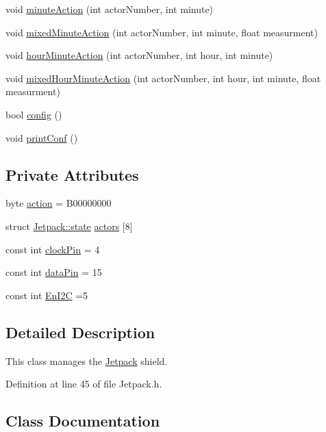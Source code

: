 \begin{DoxyCompactItemize}
\item 
void \hyperlink{class_jetpack_a97da41141c7b53ddee61143519c8d17d}{minute\+Action} (int actor\+Number, int minute)
\item 
void \hyperlink{class_jetpack_acf8ed1fb594b9e8e224f4ed872a8e093}{mixed\+Minute\+Action} (int actor\+Number, int minute, float measurment)
\item 
void \hyperlink{class_jetpack_ae01c13c785ebdf1b0bb5500234aba1bd}{hour\+Minute\+Action} (int actor\+Number, int hour, int minute)
\item 
void \hyperlink{class_jetpack_a273dae1517b56f0242e28b8944edc26b}{mixed\+Hour\+Minute\+Action} (int actor\+Number, int hour, int minute, float measurment)
\item 
bool \hyperlink{class_jetpack_ab065ee83e244265a2223a22f3ee4a719}{config} ()
\item 
void \hyperlink{class_jetpack_ac54a7bb4f9166bee32052253d9b1d306}{print\+Conf} ()
\end{DoxyCompactItemize}
\subsection*{Private Attributes}
\begin{DoxyCompactItemize}
\item 
byte \hyperlink{class_jetpack_aca3142925a7b0834b34ae91d26af7765}{action} = B00000000
\item 
struct \hyperlink{class_jetpack_da/d35/struct_jetpack_1_1state}{Jetpack\+::state} \hyperlink{class_jetpack_a7e16d2f97837f9712a2e6de1c50d99db}{actors} \mbox{[}8\mbox{]}
\item 
const int \hyperlink{class_jetpack_a58ebb991f358f3ae94e82148b0221b5a}{clock\+Pin} = 4
\item 
const int \hyperlink{class_jetpack_a3d669a56e93c71dd25f970d4ed7d0c00}{data\+Pin} = 15
\item 
const int \hyperlink{class_jetpack_a81df984fb4cea98c71aa1a1cfcdfe814}{En\+I2C} =5
\end{DoxyCompactItemize}


\subsection{Detailed Description}
This class manages the \hyperlink{class_jetpack}{Jetpack} shield. 

Definition at line 45 of file Jetpack.\+h.



\subsection{Class Documentation}
\label{struct_jetpack_1_1state}
